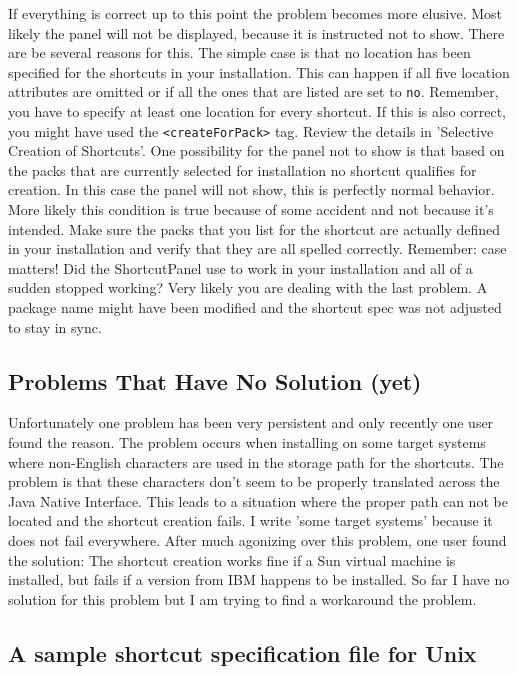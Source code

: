 If everything is correct up to this point the problem becomes more
elusive.  Most likely the panel will not be displayed, because it is instructed
not to show. There are be several reasons for this. The simple
case is that no location has been specified for the shortcuts in your
installation. This can happen if all five location attributes are
omitted or if all the ones that are listed are set to \texttt{no}.
Remember, you have to specify at least one location for every shortcut. If
this is also correct, you might have used the \texttt{<createForPack>} tag. Review
the details in 'Selective Creation of Shortcuts'. One possibility for
the panel not to show is that based on the packs that are currently
selected for installation no shortcut qualifies for creation. In this
case the panel will not show, this is perfectly normal behavior. More
likely this condition is true because of some accident and not because
it's intended. Make sure the packs that you list for the shortcut are
actually defined in your installation and verify that they are all
spelled correctly. Remember: case matters! Did the ShortcutPanel use to
work in your installation and all of a sudden stopped working? Very
likely you are dealing with the last problem. A package name might have
been modified and the shortcut spec was not adjusted to stay in sync.\\

\subsection{Problems That Have No Solution (yet)}

Unfortunately one problem has been very persistent and only recently one
user found the reason. The problem occurs when installing on some target
systems where non-English characters are used in the storage path for
the shortcuts. The problem is that these characters don't seem to be
properly translated across the Java Native Interface. This leads to a
situation where the proper path can not be located and the shortcut
creation fails. I write 'some target systems' because it does not fail
everywhere. After much agonizing over this problem, one user found the
solution: The shortcut creation works fine if a Sun virtual machine is
installed, but fails if a version from IBM happens to be installed. So
far I have no solution for this problem but I am trying to find a
workaround the problem.\\

\subsection{A sample shortcut specification file for Unix}

